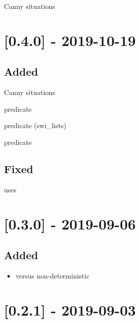 \begin{shortlist}
    \item Canny situations
\end{shortlist}

\section{[0.4.0] - 2019-10-19}

\subsection{Added}

\begin{shortlist}
    \item Canny situations
    \item {} predicate
    \item {} predicate (swi_lists)
    \item {} predicate
\end{shortlist}

\subsection{Fixed}

\begin{shortlist}
    \item {} uses 
\end{shortlist}

\section{[0.3.0] - 2019-09-06}

\subsection{Added}

\begin{itemize}
    \item {} versus non-deterministic 
\end{itemize}

\section{[0.2.1] - 2019-09-03}

